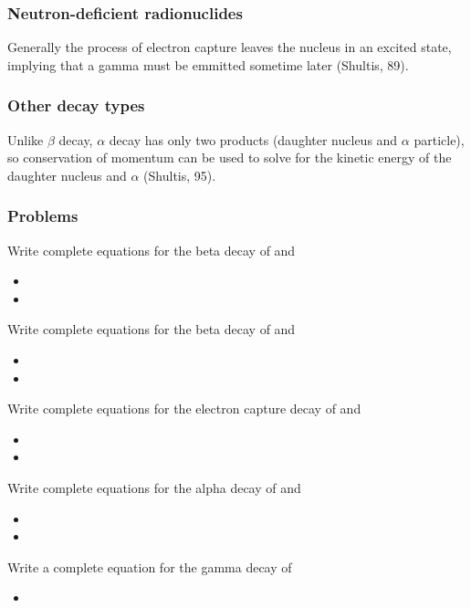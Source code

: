 \documentclass{article}
\begin{document}
\newpage

\subsubsection{Neutron-deficient radionuclides}
Generally the process of electron capture leaves the nucleus in an excited state, implying that a gamma must be emmitted sometime later (Shultis, 89).

\newpage

\subsubsection{Other decay types}
Unlike $\beta$ decay, $\alpha$ decay has only two products (daughter nucleus and $\alpha$ particle), so conservation of momentum can be used to solve for the kinetic energy of the daughter nucleus and $\alpha$ (Shultis, 95).

\subsubsection{Problems}
Write complete equations for the beta decay of  and 
\begin{itemize}
    \item {}
    \item {}
\end{itemize}
Write complete equations for the beta decay of  and 
\begin{itemize}
    \item {}
    \item {}
\end{itemize}
Write complete equations for the electron capture decay of  and 
\begin{itemize}
    \item {}
    \item {}
\end{itemize}
Write complete equations for the alpha decay of  and 
\begin{itemize}
    \item {}
    \item {}
\end{itemize}
Write a complete equation for the gamma decay of 
\begin{itemize}
    \item {}
\end{itemize}
\end{document}
